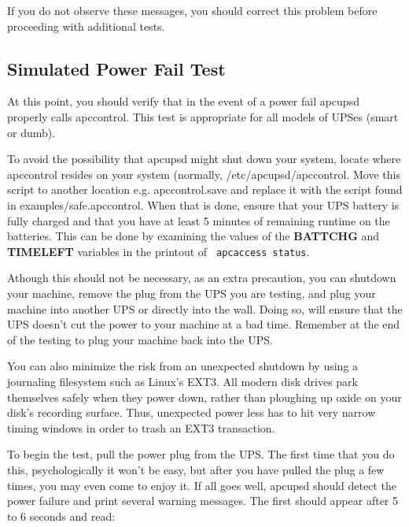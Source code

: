 If you do not observe these messages, you should correct this problem before
proceeding with additional tests. 

\label{Simulated-Power-Fail-Test}

\subsection*{Simulated Power Fail Test}

\label{index-Testing_002c-Simulate-Power-Fail-93}
\label{index-Simulate-Power-Fail-Test-94}
At this point, you should verify that in the event of a power fail apcupsd
properly calls apccontrol. This test is appropriate for all models of UPSes
(smart or dumb).  

To avoid the possibility that apcupsd might shut down your system, locate
where apccontrol resides on your system (normally, /etc/apcupsd/apccontrol.
Move this script to another location e.g. apccontrol.save and replace it with
the script found in examples/safe.apccontrol. When that is done, ensure that
your UPS battery is fully charged and that you have at least 5 minutes of
remaining runtime on the batteries. This can be done by examining the values
of the {\bf BATTCHG} and {\bf TIMELEFT} variables in the printout of {\tt
apcaccess status}.  

Athough this should not be necessary, as an extra precaution, you can shutdown
your machine, remove the plug from the UPS you are testing, and plug your
machine into another UPS or directly into the wall. Doing so, will ensure that
the UPS doesn't cut the power to your machine at a bad time. Remember at the
end of the testing to plug your machine back into the UPS.  

You can also minimize the risk from an unexpected shutdown by using a
journaling filesystem such as Linux's EXT3.  All modern disk drives park
themselves safely when they power down, rather than ploughing up oxide on your
disk's recording surface.  Thus, unexpected power less has to hit very narrow
timing windows in order to trash an EXT3 transaction.  

To begin the test, pull the power plug from the UPS. The first time that you
do this, psychologically it won't be easy, but after you have pulled the plug
a few times, you may even come to enjoy it. If all goes well, apcupsd should
detect the power failure and print several warning messages. The first should
appear after 5 to 6 seconds and read: 

